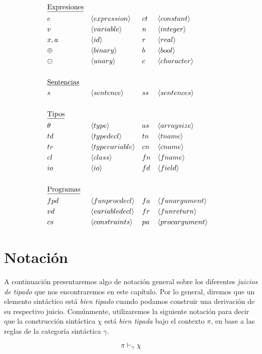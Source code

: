 \begin{align*}
&\text{\underline{Expresiones}}
\\
&e       & &\langle expression \rangle     &  &ct      & &\langle constant \rangle       \\
&v       & &\langle variable \rangle       &  &n       & &\langle integer \rangle        \\
&x, a    & &\langle id \rangle             &  &r       & &\langle real \rangle           \\
&\oplus  & &\langle binary \rangle         &  &b       & &\langle bool \rangle           \\
&\ominus & &\langle unary \rangle          &  &c       & &\langle character \rangle      \\
\\
&\text{\underline{Sentencias}}
\\
&s       & &\langle sentence \rangle       &  &ss      & &\langle sentences \rangle      \\
\\
&\text{\underline{Tipos}}
\\
&\theta & &\langle type \rangle            &  &as      & &\langle arraysize \rangle      \\
&td     & &\langle typedecl \rangle        &  &tn      & &\langle tname \rangle          \\
&tv     & &\langle typevariable \rangle    &  &cn      & &\langle cname \rangle          \\
&cl     & &\langle class \rangle           &  &fn      & &\langle fname \rangle          \\
&io     & &\langle io \rangle              &  &fd      & &\langle field \rangle          \\
\\
&\text{\underline{Programas}}
\\
&fpd     & &\langle funprocdecl \rangle    &  &fa      & &\langle funargument \rangle    \\
&vd      & &\langle variabledecl \rangle   &  &fr      & &\langle funreturn \rangle      \\
&cs      & &\langle constraints \rangle    &  &pa      & &\langle procargument \rangle   \\
\end{align*}

\section{Notación}

A continuación presentaremos algo de notación general sobre los diferentes \textit{juicios de tipado} que nos encontraremos en este capítulo.
Por lo general, diremos que un elemento sintáctico está \textit{bien tipado} cuando podamos construir una derivación de su respectivo juicio.
Comúnmente, utilizaremos la siguiente notación para decir que la construcción sintáctica $\chi$ está \textit{bien tipada} bajo el contexto $\pi$, en base a las reglas de la categoría sintáctica $\gamma$.
\begin{gather*}
\pi \DASH{\gamma} \chi
\end{gather*}

